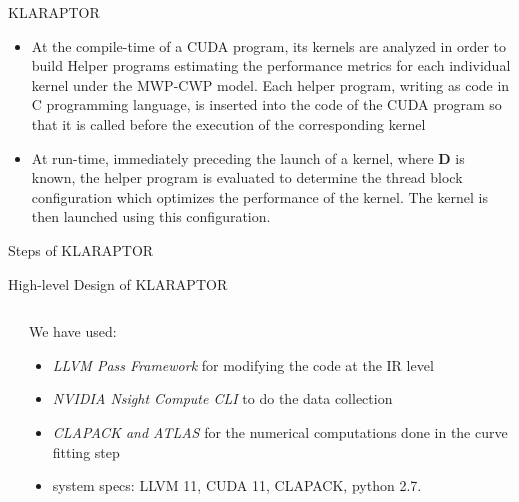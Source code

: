 \begin{frame}
\begin{block}{KLARAPTOR}
		\begin{itemize}
			\item At the compile-time of a CUDA program, its kernels are analyzed in order to build Helper programs estimating the performance metrics for each individual kernel under the MWP-CWP model. Each helper program, writing as code in C programming language, is inserted into the code of the CUDA program so that it is called before the execution of the corresponding kernel
			\item At run-time, immediately preceding the launch of a kernel, where $\bm D$ is known, the helper program is evaluated to determine the thread block configuration which optimizes the performance of the kernel. The kernel is then launched using this configuration.
		\end{itemize}
	\end{block}
\end{frame}

\begin{frame}{Steps of KLARAPTOR}
	
\end{frame}
\begin{frame}{High-level Design of KLARAPTOR}
	\begin{columns}
		\begin{column}{0.5\textwidth}
			
		\end{column}
		\begin{column}{0.5\textwidth}
			\begin{block}{We have used:}
				\begin{itemize}
					\item {\em LLVM Pass Framework} for modifying the code at the IR level
					\item {\em NVIDIA Nsight Compute CLI} to do the data collection
					\item {\em CLAPACK and ATLAS} for the numerical computations done in the curve fitting step
					\item system specs: LLVM 11, CUDA 11, CLAPACK, python 2.7.
				\end{itemize}
			\end{block}
		\end{column}
	\end{columns}
\end{frame}



